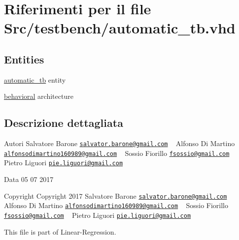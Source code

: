 \hypertarget{automatic__tb_8vhd}{\section{Riferimenti per il file Src/testbench/automatic\+\_\+tb.vhd}
\label{automatic__tb_8vhd}
}
\subsection*{Entities}
\begin{DoxyCompactItemize}
\item 
\hyperlink{classautomatic__tb}{automatic\+\_\+tb} entity
\item 
\hyperlink{classautomatic__tb_1_1behavioral}{behavioral} architecture
\end{DoxyCompactItemize}


\subsection{Descrizione dettagliata}
\begin{DoxyAuthor}{Autori}
Salvatore Barone \href{mailto:salvator.barone@gmail.com}{\tt salvator.\+barone@gmail.\+com} ~\newline
 Alfonso Di Martino \href{mailto:alfonsodimartino160989@gmail.com}{\tt alfonsodimartino160989@gmail.\+com} ~\newline
 Sossio Fiorillo \href{mailto:fsossio@gmail.com}{\tt fsossio@gmail.\+com} ~\newline
 Pietro Liguori \href{mailto:pie.liguori@gmail.com}{\tt pie.\+liguori@gmail.\+com} ~\newline

\end{DoxyAuthor}
\begin{DoxyDate}{Data}
05 07 2017
\end{DoxyDate}
\begin{DoxyCopyright}{Copyright}
Copyright 2017 Salvatore Barone \href{mailto:salvator.barone@gmail.com}{\tt salvator.\+barone@gmail.\+com} ~\newline
 Alfonso Di Martino \href{mailto:alfonsodimartino160989@gmail.com}{\tt alfonsodimartino160989@gmail.\+com} ~\newline
 Sossio Fiorillo \href{mailto:fsossio@gmail.com}{\tt fsossio@gmail.\+com} ~\newline
 Pietro Liguori \href{mailto:pie.liguori@gmail.com}{\tt pie.\+liguori@gmail.\+com} ~\newline

\end{DoxyCopyright}
This file is part of Linear-\/\+Regression.

